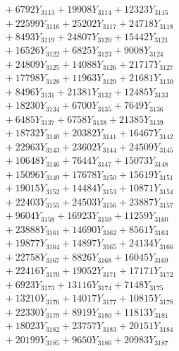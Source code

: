 \documentclass[a4paper,10pt]{article}
\begin{document}
{\begin{align}
&\;  + 6792 Y_{3113} + 19908 Y_{3114} + 12323 Y_{3115} \\[0.3ex]
&\;  + 22599 Y_{3116} + 25202 Y_{3117} + 24718 Y_{3118} \\[0.5ex]\allowbreak
&\;  + 8493 Y_{3119} + 24807 Y_{3120} + 15442 Y_{3121} \\[0.3ex]
&\;  + 16526 Y_{3122} + 6825 Y_{3123} + 9008 Y_{3124} \\[0.3ex]
&\;  + 24809 Y_{3125} + 14088 Y_{3126} + 21717 Y_{3127} \\[0.3ex]
&\;  + 17798 Y_{3128} + 11963 Y_{3129} + 21681 Y_{3130} \\[0.3ex]
&\;  + 8496 Y_{3131} + 21381 Y_{3132} + 12485 Y_{3133} \\[0.3ex]
&\;  + 18230 Y_{3134} + 6700 Y_{3135} + 7649 Y_{3136} \\[0.3ex]
&\;  + 6485 Y_{3137} + 6758 Y_{3138} + 21385 Y_{3139} \\[0.3ex]
&\;  + 18732 Y_{3140} + 20382 Y_{3141} + 16467 Y_{3142} \\[0.3ex]
&\;  + 22963 Y_{3143} + 23602 Y_{3144} + 24509 Y_{3145} \\[0.3ex]
&\;  + 10648 Y_{3146} + 7644 Y_{3147} + 15073 Y_{3148} \\[0.5ex]\allowbreak
&\;  + 15096 Y_{3149} + 17678 Y_{3150} + 15619 Y_{3151} \\[0.3ex]
&\;  + 19015 Y_{3152} + 14484 Y_{3153} + 10871 Y_{3154} \\[0.3ex]
&\;  + 22403 Y_{3155} + 24503 Y_{3156} + 23887 Y_{3157} \\[0.3ex]
&\;  + 9604 Y_{3158} + 16923 Y_{3159} + 11259 Y_{3160} \\[0.3ex]
&\;  + 23888 Y_{3161} + 14690 Y_{3162} + 8561 Y_{3163} \\[0.3ex]
&\;  + 19877 Y_{3164} + 14897 Y_{3165} + 24134 Y_{3166} \\[0.3ex]
&\;  + 22758 Y_{3167} + 8826 Y_{3168} + 16045 Y_{3169} \\[0.3ex]
&\;  + 22416 Y_{3170} + 19052 Y_{3171} + 17171 Y_{3172} \\[0.3ex]
&\;  + 6923 Y_{3173} + 13116 Y_{3174} + 7148 Y_{3175} \\[0.3ex]
&\;  + 13210 Y_{3176} + 14017 Y_{3177} + 10815 Y_{3178} \\[0.5ex]\allowbreak
&\;  + 22330 Y_{3179} + 8919 Y_{3180} + 11813 Y_{3181} \\[0.3ex]
&\;  + 18023 Y_{3182} + 23757 Y_{3183} + 20151 Y_{3184} \\[0.3ex]
&\;  + 20199 Y_{3185} + 9650 Y_{3186} + 20983 Y_{3187} \\[0.3ex]

\end{align}}
\end{document}
